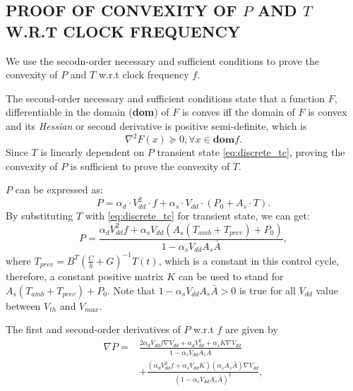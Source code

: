 \begin{appendices}
\section{PROOF OF CONVEXITY OF $P$ AND $T$ W.R.T CLOCK FREQUENCY}
We use the secodn-order necessary and sufficient conditions to prove the convexity of $P$ and $T$ w.r.t clock frequency $f$.

The second-order necessary and sufficient conditions state that a function $F$, differentiable in the domain (\textbf{dom}) of $F$ is conves iff the domain of $F$ is convex and its \textit{Hessian} or second derivative is positive semi-definite, which is
\begin{equation}\label{eq:hessian}
\nabla^{2}F(x) \succeq 0, \forall x \in \textbf{dom} f.
\end{equation}
Since $T$ is linearly dependent on $P$ transient state \eqref{eq:discrete_tc}, proving the convexity of $P$ is sufficient to prove the convexity of $T$.

$P$ can be expressed as:
\begin{equation}\label{eq:p_detail}
P =\alpha_{d}\cdot V_{dd}^{2} \cdot f+\alpha_{s}\cdot V_{dd} \cdot (P_{0}+A_{s} \cdot T).
\end{equation}
By substituting $T$ with \eqref{eq:discrete_tc} for transient state, we can get:
\begin{equation}\label{eq:p_transient}
P =\frac{\alpha_{d}V_{dd}^{2}f+\alpha_{s}V_{dd}(A_{s}(T_{amb}+T_{prev})+P_{0})}{1-\alpha_{s}V_{dd}A_{s}\bar{A}},
\end{equation}
where $T_{prev}=B^{T}(\frac{C}{h}+G)^{-1}T(t)$, which is a constant in this control cycle, therefore, a constant positive matrix $K$ can be used to stand for $A_{s}(T_{amb}+T_{prev})+P_{0}$. Note that $1-\alpha_{s}V_{dd}A_{s}\bar{A}>0$ is true for all $V_{dd}$ value between $V_{th}$ and $V_{max}$.

The first and second-order derivatives of $P$ w.r.t $f$ are given by
\begin{equation}\label{eq:p_transient_d1}
\begin{split}
\nabla P =&\frac{2\alpha_{d}V_{dd}f\nabla V_{dd}+\alpha_{d}V_{dd}^{2}+\alpha_{s}K\nabla V_{dd}}{1-\alpha_{s}V_{dd}A_{s}\bar{A}}\\
&+\frac{(\alpha_{d}V_{dd}^{2}f+\alpha_{s}V_{dd}K)(\alpha_{s}A_{s}\bar{A})\nabla V_{dd} }{(1-\alpha_{s}V_{dd}A_{s}\bar{A})^{2}},
\end{split}
\end{equation}


\end{appendices}
